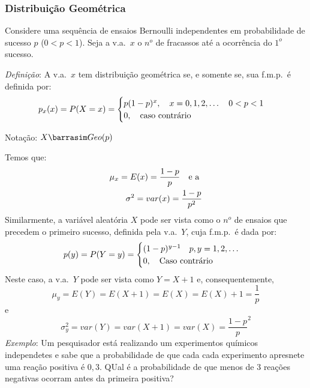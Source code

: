 \documentclass[11pt,a4paper]{article}
\begin{document}
\subsubsection{Distribuição Geométrica}
Considere uma sequência de ensaios Bernoulli independentes em probabilidade de 
sucesso $p$ ($0<p<1$). Seja a v.a.\ $x$ o $n^o$ de fracassos até a ocorrência 
do $1^o$ sucesso. 

\emph{Definição}: A v.a.\ $x$ tem distribuição geométrica se, e somente se, sua 
f.m.p.\ é definida por: 
\begin{align}
  p_{x}(x)=P(X=x)=\begin{cases}
    p(1-p)^x, \text{\quad }x=0,1,2,\dots \text{\quad}0<p<1\\
    0, \text{\quad caso contrário}
  \end{cases}
\end{align}
\begin{center}Notação: $X \barrasim Geo(p)$\end{center}
Temos que:
\begin{align}
  \mu_{x}=E(x)=\frac{1-p}{p} \text{\quad e a }\\
  \sigma^2 = var(x)=\frac{1-p}{p^2}
\end{align}
Similarmente, a variável aleatória $X$ pode ser vista como o $n^o$ de ensaios que
precedem o primeiro sucesso, definida pela v.a.\ $Y$, cuja f.m.p.\ é dada por:
\begin{align*}
  p(y)=P(Y=y)=\begin{cases}
    (1-p)^{y-1} \text{\quad }p,y=1,2,\dots \\
    0, \text{\quad Caso contrário}
  \end{cases}
\end{align*}
Neste caso, a v.a.\ $Y$ pode ser vista como $Y=X+1$ e, consequentemente,
$$\mu_y=E(Y)=E(X+1)=E(X)=E(X)+1= \frac{1}{p}$$ 
e
$$\sigma_y^2=var(Y)=var(X+1)=var(X)= \frac{1-p}{p}^2$$ 
\emph{Exemplo}: Um pesquisador está realizando um experimentos químicos independetes 
e sabe que a probabilidade de que cada cada experimento apresnete uma reação 
positiva é $0,3$. QUal é a probabilidade de que menos de 3 reações negativas 
ocorram antes da primeira positiva?
\end{document}
